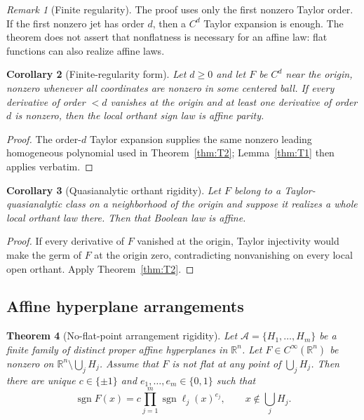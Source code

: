 \documentclass[11pt]{article}
\newtheorem{theorem}{Theorem}[section]
\newtheorem{corollary}[theorem]{Corollary}
\theoremstyle{definition}
\theoremstyle{remark}
\newtheorem{remark}[theorem]{Remark}
\newcommand{\R}{\mathbb{R}}
\newcommand{\bits}{\{0,1\}}
\newcommand{\sign}{\operatorname{sgn}}
\newcommand{\cA}{\mathcal{A}}
\begin{document}
\begin{remark}[Finite regularity]
The proof uses only the first nonzero Taylor order. If the first nonzero jet has order $d$, then a $C^d$ Taylor expansion is enough. The theorem does not assert that nonflatness is necessary for an affine law: flat functions can also realize affine laws.
\end{remark}

\begin{corollary}[Finite-regularity form]\label{cor:finiteC}
Let $d\ge 0$ and let $F$ be $C^d$ near the origin, nonzero whenever all coordinates are nonzero in some centered ball. If every derivative of order $<d$ vanishes at the origin and at least one derivative of order $d$ is nonzero, then the local orthant sign law is affine parity.
\end{corollary}

\begin{proof}
The order-$d$ Taylor expansion supplies the same nonzero leading homogeneous polynomial used in Theorem~\ref{thm:T2}; Lemma~\ref{thm:T1} then applies verbatim.
\end{proof}

\begin{corollary}[Quasianalytic orthant rigidity]\label{cor:quasiorth}
Let $F$ belong to a Taylor-quasianalytic class on a neighborhood of the origin and suppose it realizes a whole local orthant law there. Then that Boolean law is affine.
\end{corollary}

\begin{proof}
If every derivative of $F$ vanished at the origin, Taylor injectivity would make the germ of $F$ at the origin zero, contradicting nonvanishing on every local open orthant. Apply Theorem~\ref{thm:T2}.
\end{proof}

\subsection{Affine hyperplane arrangements}

\begin{theorem}[No-flat-point arrangement rigidity]\label{thm:T3}
Let $\cA=\{H_1,\dots,H_m\}$ be a finite family of distinct proper affine hyperplanes in $\R^n$. Let $F\in C^\infty(\R^n)$ be nonzero on $\R^n\setminus\bigcup_jH_j$. Assume that $F$ is not flat at any point of $\bigcup_jH_j$. Then there are unique $c\in\{\pm1\}$ and $e_1,\dots,e_m\in\bits$ such that
\begin{equation}\label{eq:arrparity}
 \sign F(x)
 =c\prod_{j=1}^m\sign\ell_j(x)^{e_j},
 \qquad x\notin\bigcup_jH_j.
\end{equation}
\end{theorem}
\end{document}
